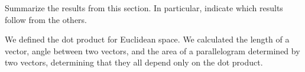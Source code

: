 \documentclass[newpage,hints,handout]{ximera}
\begin{document}
\begin{problem}
Summarize the results from this section. In particular, indicate which
results follow from the others.
\begin{freeResponse}
We defined the dot product for Euclidean space. We calculated the length of a vector, angle between two vectors, and the area of a parallelogram determined by two vectors, determining that they all depend only on the dot product. 
\end{freeResponse}
\end{problem}
\end{document}
